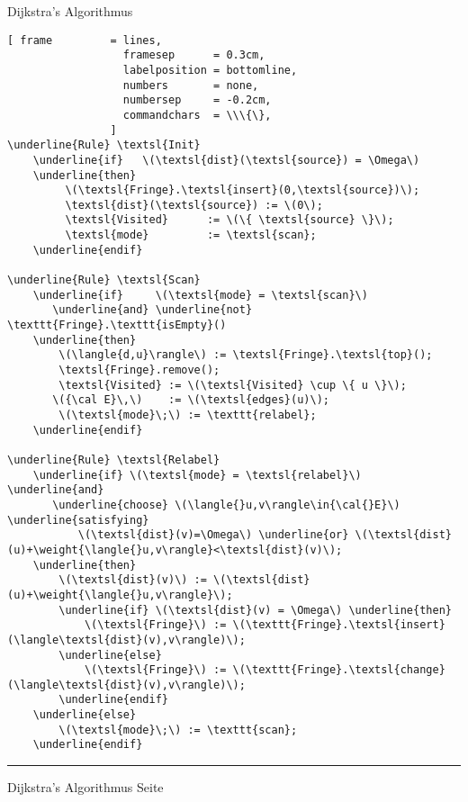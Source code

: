 \documentclass{slides}
\newcommand{\weight}[1]{\|#1\|}
\newcounter{mypage}
\begin{document}
\begin{slide}{}
\normalsize
\vspace*{-2.5cm}

\begin{center}
 Dijkstra's Algorithmus
\end{center}
\vspace*{-0.8cm}

\footnotesize
\begin{Verbatim}[ frame         = lines, 
                  framesep      = 0.3cm, 
                  labelposition = bottomline,
                  numbers       = none,
                  numbersep     = -0.2cm,
                  commandchars  = \\\{\},
                ]
\underline{Rule} \textsl{Init}
    \underline{if}   \(\textsl{dist}(\textsl{source}) = \Omega\)
    \underline{then} 
         \(\textsl{Fringe}.\textsl{insert}(0,\textsl{source})\);
         \textsl{dist}(\textsl{source}) := \(0\);
         \textsl{Visited}      := \(\{ \textsl{source} \}\);
         \textsl{mode}         := \textsl{scan};
    \underline{endif}
    
\underline{Rule} \textsl{Scan}
    \underline{if}     \(\textsl{mode} = \textsl{scan}\)
       \underline{and} \underline{not} \texttt{Fringe}.\texttt{isEmpty}()  
    \underline{then}
        \(\langle{d,u}\rangle\) := \textsl{Fringe}.\textsl{top}();
        \textsl{Fringe}.remove();
        \textsl{Visited} := \(\textsl{Visited} \cup \{ u \}\);
       \({\cal E}\,\)    := \(\textsl{edges}(u)\);            
        \(\textsl{mode}\;\) := \texttt{relabel};
    \underline{endif}

\underline{Rule} \textsl{Relabel}
    \underline{if} \(\textsl{mode} = \textsl{relabel}\)           \underline{and}  
       \underline{choose} \(\langle{}u,v\rangle\in{\cal{}E}\) \underline{satisfying}  
           \(\textsl{dist}(v)=\Omega\) \underline{or} \(\textsl{dist}(u)+\weight{\langle{}u,v\rangle}<\textsl{dist}(v)\);
    \underline{then}
        \(\textsl{dist}(v)\) := \(\textsl{dist}(u)+\weight{\langle{}u,v\rangle}\);
        \underline{if} \(\textsl{dist}(v) = \Omega\) \underline{then}
            \(\textsl{Fringe}\) := \(\texttt{Fringe}.\textsl{insert}(\langle\textsl{dist}(v),v\rangle)\);
        \underline{else}
            \(\textsl{Fringe}\) := \(\texttt{Fringe}.\textsl{change}(\langle\textsl{dist}(v),v\rangle)\);
        \underline{endif} 
    \underline{else} 
        \(\textsl{mode}\;\) := \texttt{scan};
    \underline{endif}
\end{Verbatim}

\vspace*{\fill}
\tiny \addtocounter{mypage}{1}
\rule{17cm}{1mm}
Dijkstra's Algorithmus \hspace*{\fill} Seite 
\end{slide}
\end{document}
